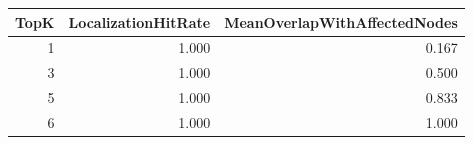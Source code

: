 \begin{tabular}{rrr}
\toprule
TopK & LocalizationHitRate & MeanOverlapWithAffectedNodes \\
\midrule
1 & 1.000 & 0.167 \\
3 & 1.000 & 0.500 \\
5 & 1.000 & 0.833 \\
6 & 1.000 & 1.000 \\
\bottomrule
\end{tabular}
